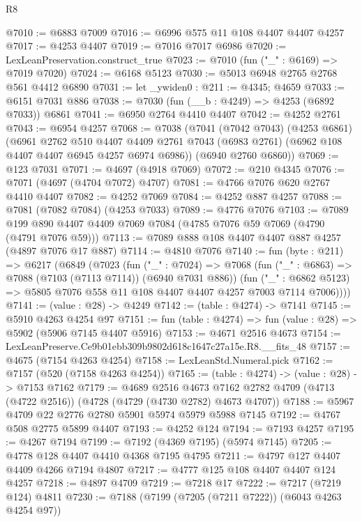 \begin{lexlean}{R8}
\begin{coremodule}
@7010 := @6883 @7009
@7016 := @6996 @575 @11 @108 @4407 @4407 @4257
@7017 := @4253 @4407
@7019 := @7016 @7017 @6986
@7020 := LexLeanPreservation.construct_true
@7023 := @7010 (fun ("_" : @6169) => @7019 @7020)
@7024 := @6168 @5123
@7030 := @5013 @6948 @2765 @2768 @561 @4412 @6890
@7031 := let _ywiden0 : @211 := @4345; @4659
@7033 := @6151 @7031 @886
@7038 := @7030 (fun (__b : @4249) => @4253 (@6892 @7033)) @6861
@7041 := @6950 @2764 @4410 @4407
@7042 := @4252 @2761
@7043 := @6954 @4257
@7068 := @7038
    (@7041
      (@7042 @7043)
      (@4253 @6861)
      (@6961
        @2762
        @510
        @4407
        @4409
        @2761
        @7043
        (@6983 @2761)
        (@6962 @108 @4407 @4407 @6945 @4257 @6974 @6986))
      (@6940 @2760 @6860))
@7069 := @123 @7031
@7071 := @4697 (@4918 @7069)
@7072 := @210 @4345
@7076 := @7071 (@4697 (@4704 @7072) @4707)
@7081 := @4766 @7076 @620 @2767 @4410 @4407
@7082 := @4252 @7069
@7084 := @4252 @887 @4257
@7088 := @7081 (@7082 @7084) (@4253 @7033)
@7089 := @4776 @7076
@7103 := @7089 @199 @890 @4407 @4409 @7069 @7084 (@4785 @7076 @59 @7069 (@4790 (@4791 @7076 @59)))
@7113 := @7089 @888 @108 @4407 @4407 @887 @4257 (@4897 @7076 @17 @887)
@7114 := @4810 @7076
@7140 := fun (byte : @211) =>
  @6217
    (@6849
      (@7023
        (fun ("_" : @7024) =>
        @7068
          (fun ("_" : @6863) => @7088 (@7103 (@7113 @7114)) (@6940 @7031 @886))
          (fun ("_" : @6862 @5123) =>
          @5805 @7076 @558 @11 @108 @4407 @4407 @4257 @7003 @7114 @7006))))
@7141 := (value : @28) -> @4249
@7142 := (table : @4274) -> @7141
@7145 := @5910 @4263 @4254 @97
@7151 := fun (table : @4274) => fun (value : @28) => @5902 (@5906 @7145 @4407 @5916)
@7153 := @4671 @2516 @4673
@7154 := LexLeanPreserve.Ce9b01ebb309b9802d618c1647c27a15e.R8.__fits_48
@7157 := @4675 (@7154 @4263 @4254)
@7158 := LexLeanStd.Numeral.pick
@7162 := @7157 (@520 (@7158 @4263 @4254))
@7165 := (table : @4274) -> (value : @28) -> @7153 @7162
@7179 := @4689
    @2516
    @4673
    @7162
    @2782
    @4709
    (@4713 (@4722 @2516))
    (@4728 (@4729 (@4730 @2782) @4673 @4707))
@7188 := @5967 @4709 @22 @2776 @2780 @5901 @5974 @5979 @5988 @7145
@7192 := @4767 @508 @2775 @5899 @4407
@7193 := @4252 @124
@7194 := @7193 @4257
@7195 := @4267 @7194
@7199 := @7192 (@4369 @7195) (@5974 @7145)
@7205 := @4778 @128 @4407 @4410 @4368 @7195 @4795
@7211 := @4797 @127 @4407 @4409 @4266 @7194 @4807
@7217 := @4777 @125 @108 @4407 @4407 @124 @4257
@7218 := @4897 @4709
@7219 := @7218 @17
@7222 := @7217 (@7219 @124) @4811
@7230 := @7188 (@7199 (@7205 (@7211 @7222)) (@6043 @4263 @4254 @97))

\end{coremodule}
\end{lexlean}
